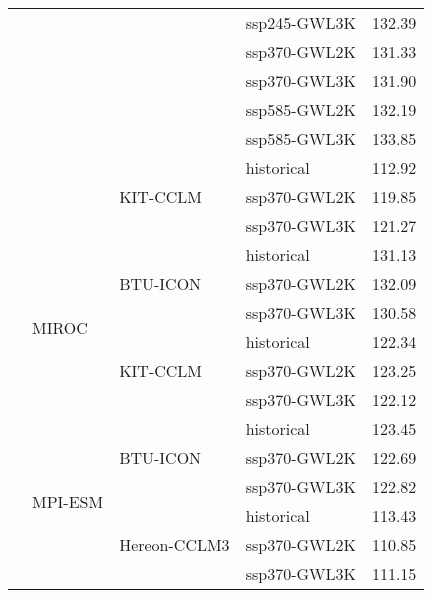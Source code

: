 \begin{table}[!htbp]
\begin{tabular}{lll|l|c}
 &  &  & ssp245-GWL3K & 132.39 \\
 &  &  & ssp370-GWL2K & 131.33 \\
 &  &  & ssp370-GWL3K & 131.90 \\
 &  &  & ssp585-GWL2K & 132.19 \\
 &  &  & ssp585-GWL3K & 133.85 \\
\cmidrule(lr){3-5}
 &  & \multirow{3}{*}{KIT-CCLM} & historical & 112.92 \\
 &  &  & ssp370-GWL2K & 119.85 \\
 &  &  & ssp370-GWL3K & 121.27 \\
\cmidrule(lr){3-5}
\cmidrule(lr){2-5}
 & \multirow{6}{*}{MIROC} & \multirow{3}{*}{BTU-ICON} & historical & 131.13 \\
 &  &  & ssp370-GWL2K & 132.09 \\
 &  &  & ssp370-GWL3K & 130.58 \\
\cmidrule(lr){3-5}
 &  & \multirow{3}{*}{KIT-CCLM} & historical & 122.34 \\
 &  &  & ssp370-GWL2K & 123.25 \\
 &  &  & ssp370-GWL3K & 122.12 \\
\cmidrule(lr){3-5}
\cmidrule(lr){2-5}
 & \multirow{6}{*}{MPI-ESM} & \multirow{3}{*}{BTU-ICON} & historical & 123.45 \\
 &  &  & ssp370-GWL2K & 122.69 \\
 &  &  & ssp370-GWL3K & 122.82 \\
\cmidrule(lr){3-5}
 &  & \multirow{3}{*}{Hereon-CCLM3} & historical & 113.43 \\
 &  &  & ssp370-GWL2K & 110.85 \\
 &  &  & ssp370-GWL3K & 111.15 \\
\bottomrule
\end{tabular}
\end{table}
